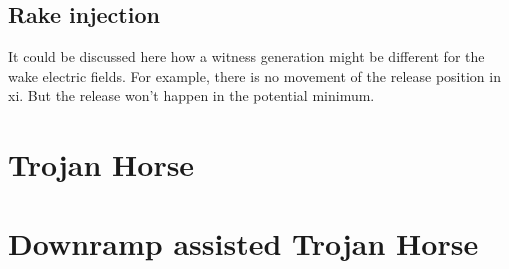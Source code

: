 	
	\subsection{Rake injection}
	It could be discussed here how a witness generation might be different for the wake electric fields.
	For example, there is no movement of the release position in xi. But the release won't happen in the potential minimum.
\section{Trojan Horse}
\label{sec:Theory_TrojanHorse}
	
\section{Downramp assisted Trojan Horse}
	
